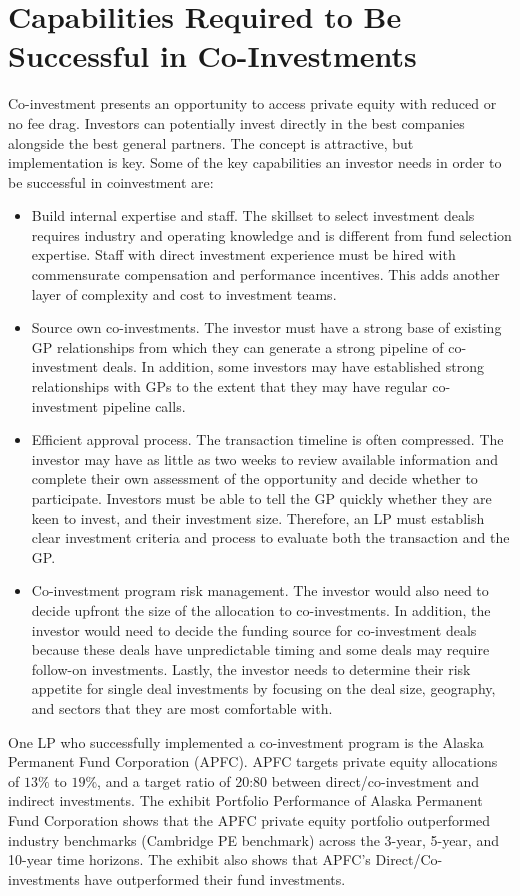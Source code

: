 \documentclass[11pt]{article}
\begin{document}
\section*{Capabilities Required to Be Successful in Co-Investments}
Co-investment presents an opportunity to access private equity with reduced or no fee drag. Investors can potentially invest directly in the best companies alongside the best general partners. The concept is attractive, but implementation is key. Some of the key capabilities an investor needs in order to be successful in coinvestment are:

\begin{itemize}
  \item Build internal expertise and staff. The skillset to select investment deals requires industry and operating knowledge and is different from fund selection expertise. Staff with direct investment experience must be hired with commensurate compensation and performance incentives. This adds another layer of complexity and cost to investment teams.
  \item Source own co-investments. The investor must have a strong base of existing GP relationships from which they can generate a strong pipeline of co-investment deals. In addition, some investors may have established strong relationships with GPs to the extent that they may have regular co-investment pipeline calls.
  \item Efficient approval process. The transaction timeline is often compressed. The investor may have as little as two weeks to review available information and complete their own assessment of the opportunity and decide whether to participate. Investors must be able to tell the GP quickly whether they are keen to invest, and their investment size. Therefore, an LP must establish clear investment criteria and process to evaluate both the transaction and the GP.
  \item Co-investment program risk management. The investor would also need to decide upfront the size of the allocation to co-investments. In addition, the investor would need to decide the funding source for co-investment deals because these deals have unpredictable timing and some deals may require follow-on investments. Lastly, the investor needs to determine their risk appetite for single deal investments by focusing on the deal size, geography, and sectors that they are most comfortable with.
\end{itemize}

One LP who successfully implemented a co-investment program is the Alaska Permanent Fund Corporation (APFC). APFC targets private equity allocations of $13 \%$ to $19 \%$, and a target ratio of 20:80 between direct/co-investment and indirect investments. The exhibit Portfolio Performance of Alaska Permanent Fund Corporation shows that the APFC private equity portfolio outperformed industry benchmarks (Cambridge PE benchmark) across the 3-year, 5-year, and 10-year time horizons. The exhibit also shows that APFC's Direct/Co-investments have outperformed their fund investments.
\end{document}
